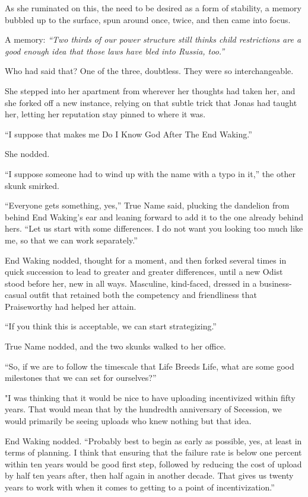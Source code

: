 As she ruminated on this, the need to be desired as a form of stability, a memory bubbled up to the surface, spun around once, twice, and then came into focus.

A memory: \emph{``Two thirds of our power structure still thinks child restrictions are a good enough idea that those laws have bled into Russia, too.''}

Who had said that? One of the three, doubtless. They were so interchangeable.

She stepped into her apartment from wherever her thoughts had taken her, and she forked off a new instance, relying on that subtle trick that Jonas had taught her, letting her reputation stay pinned to where it was.

``I suppose that makes me Do I Know God After The End Waking.''

She nodded.

``I suppose someone had to wind up with the name with a typo in it,'' the other skunk smirked.

``Everyone gets something, yes,'' True Name said, plucking the dandelion from behind End Waking's ear and leaning forward to add it to the one already behind hers. ``Let us start with some differences. I do not want you looking too much like me, so that we can work separately.''

End Waking nodded, thought for a moment, and then forked several times in quick succession to lead to greater and greater differences, until a new Odist stood before her, new in all ways. Masculine, kind-faced, dressed in a business-casual outfit that retained both the competency and friendliness that Praiseworthy had helped her attain.

``If you think this is acceptable, we can start strategizing.''

True Name nodded, and the two skunks walked to her office.

``So, if we are to follow the timescale that Life Breeds Life, what are some good milestones that we can set for ourselves?''

"I was thinking that it would be nice to have uploading incentivized within fifty years. That would mean that by the hundredth anniversary of Secession, we would primarily be seeing uploads who knew nothing but that idea.

End Waking nodded. ``Probably best to begin as early as possible, yes, at least in terms of planning. I think that ensuring that the failure rate is below one percent within ten years would be good first step, followed by reducing the cost of upload by half ten years after, then half again in another decade. That gives us twenty years to work with when it comes to getting to a point of incentivization.''

